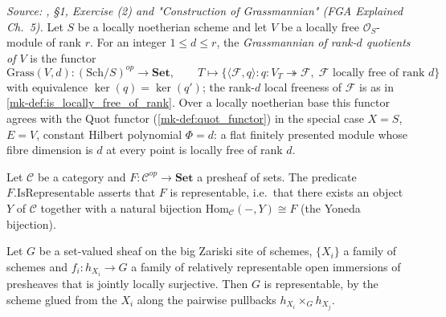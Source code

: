 \begin{definition}\label{mk-def:grassmannian_scheme}
  \leanok

  \textit{Source: \cite{nitsure-hilbert-quot}, \S 1, Exercise (2) and "Construction of
  Grassmannian" (FGA Explained Ch.~5).}
  Let \(S\) be a locally noetherian scheme and let \(V\) be a locally free
  \(\mathcal{O}_S\)-module of rank \(r\). For an integer \(1 \le d \le r\), the
  \emph{Grassmannian of rank-\(d\) quotients of \(V\)} is the functor
  \[
    \mathrm{Grass}(V, d) : (\mathrm{Sch}/S)^{op} \longrightarrow \mathbf{Set},
    \qquad
    T \longmapsto \{ \langle \mathcal{F}, q\rangle :
    q : V_T \twoheadrightarrow \mathcal{F},\; \mathcal{F}
    \text{ locally free of rank } d \}
  \]
  with equivalence \(\ker(q) = \ker(q')\); the rank-\(d\) local freeness of
  \(\mathcal{F}\) is as in \ref{mk-def:is_locally_free_of_rank}. Over a locally
  noetherian base this functor agrees with the Quot functor
  (\ref{mk-def:quot_functor}) in the special case \(X = S\), \(E = V\), constant
  Hilbert polynomial \(\Phi = d\): a flat finitely presented module whose fibre
  dimension is \(d\) at every point is locally free of rank \(d\).
\end{definition}

\begin{lemma}
  \label{mk-lem:functor_is_representable_mathlib}
  \mathlibok

  Let \(\mathcal{C}\) be a category and \(F : \mathcal{C}^{op} \to \mathbf{Set}\)
  a presheaf of sets. The predicate \(F.\mathrm{IsRepresentable}\) asserts that
  \(F\) is representable, i.e.\ that there exists an object \(Y\) of
  \(\mathcal{C}\) together with a natural bijection
  \(\mathrm{Hom}_{\mathcal{C}}(-, Y) \cong F\) (the Yoneda bijection).
\end{lemma}

\begin{lemma}
  \label{mk-lem:local_representability_mathlib}
  \mathlibok

  Let \(G\) be a set-valued sheaf on the big Zariski site of schemes,
  \(\{X_i\}\) a family of schemes and \(f_i : h_{X_i} \to G\) a family of
  relatively representable open immersions of presheaves that is jointly
  locally surjective.  Then \(G\) is representable, by the scheme glued from
  the \(X_i\) along the pairwise pullbacks \(h_{X_i} \times_G h_{X_j}\).
\end{lemma}

